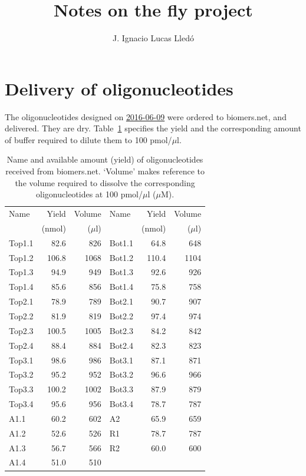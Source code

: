 \documentclass[a4paper,12pt]{article}
\author{J. Ignacio Lucas Lledó}
\title{Notes on the fly project}
\begin{document}
\maketitle
\section{Delivery of oligonucleotides}
The oligonucleotides designed on \href{https://github.com/IgnasiLucas/fly/tree/master/results/2016-06-09}{2016-06-09} were ordered to biomers.net, and delivered. They are dry. Table~\ref{tab:oligos} specifies the yield and the corresponding amount of buffer required to dilute them to 100 pmol/$\mu$l.

\begin{table}
\begin{center}
\caption{Name and available amount (yield) of oligonucleotides received from biomers.net. `Volume' makes reference to the volume required to dissolve the corresponding oligonucleotides at 100 pmol/$\mu$l ($\mu$M).}\label{tab:oligos}
\vspace*{0.3cm}
\begin{tabular}{lrr|lrr}
\toprule
Name&Yield&Volume&Name&Yield&Volume\\
&(nmol)&($\mu$l)&&(nmol)&($\mu$l)\\
\midrule
Top1.1&82.6&826&Bot1.1&64.8&648\\
Top1.2&106.8&1068&Bot1.2&110.4&1104\\
Top1.3&94.9&949&Bot1.3&92.6&926\\
Top1.4&85.6&856&Bot1.4&75.8&758\\
Top2.1&78.9&789&Bot2.1&90.7&907\\
Top2.2&81.9&819&Bot2.2&97.4&974\\
Top2.3&100.5&1005&Bot2.3&84.2&842\\
Top2.4&88.4&884&Bot2.4&82.3&823\\
Top3.1&98.6&986&Bot3.1&87.1&871\\
Top3.2&95.2&952&Bot3.2&96.6&966\\
Top3.3&100.2&1002&Bot3.3&87.9&879\\
Top3.4&95.6&956&Bot3.4&78.7&787\\
A1.1&60.2&602&A2&65.9&659\\
A1.2&52.6&526&R1&78.7&787\\
A1.3&56.7&566&R2&60.0&600\\
A1.4&51.0&510&&&\\
\bottomrule
\end{tabular}
\end{center}
\end{table}
\end{document}
